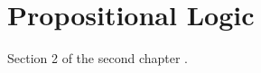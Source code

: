 \section{Propositional Logic}
Section 2 of the second chapter \cite{exemplochapter1sec2} \cite{artigo2024chapter1sec2}.

\printbibliography[heading=subbibliography, title={Referências da Seção 1.2}, keyword=chapter1secao2]